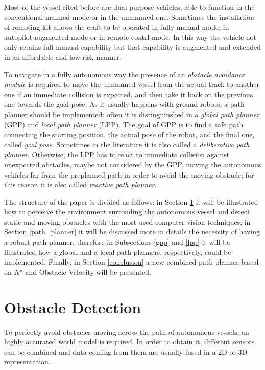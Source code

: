 \documentclass[12pt]{article}
\begin{document}
      \indent Most of the vessel cited before are dual-purpose vehicles, able to function in the conventional manned mode or in the unmanned one. Sometimes the installation of remoting kit allows the craft to be operated in fully manual mode, in autopilot-augmented mode or in remote-contrl mode. In this way the vehicle not only retains full manual capability but that capability is augmented and extended in an affordable and low-risk manner.

      \indent To navigate in a fully autonomous way the presence of an \textit{obstacle avoidance module} is required to move the unmanned vessel from the actual track to another one if an immediate collision is expected, and then take it back on the previous one towards the goal pose. As it usually happens with ground robots, a path planner should be implemented: often it is distinguinshed in a \textit{global path planner} (GPP) and \textit{local path planner} (LPP). The goal of GPP is to find a safe path connecting the starting position, the actual pose of the robot, and the final one, called \textit{goal pose}. Sometimes in the literature it is also called a \textit{deliberative path planner}. Otherwise, the LPP has to react to immediate collision against unexpected obstacles, maybe not considered by the GPP, moving the autonomous vehicles far from the preplanned path in order to avoid the moving obstacle; for this reason it is also called \textit{reactive path planner}.

      \indent The structure of the paper is divided as follows: in Section \ref{obs_det} it will be illustrated how to perceive the environment surronding the autonomous vessel and detect static and moving obstacles with the most used computer vision techniques; in Section \ref{path_planner} it will be discussed more in details the necessity of having a robust path planner, therefore in Subsections \ref{gpp} and \ref{lpp} it will be illustrated how a global and a local path planners, respectively, could be implemented. Finally, in Section \ref{conclusion} a new combined path planner based on A* and Obstacle Velocity will be presented.


\section{Obstacle Detection} \label{obs_det}

      \indent To perfectly avoid obstacles moving across the path of autonomous vessels, an highly accurated world model is required. In order to obtain it, different sensors can be combined and data coming from them are usually fused in a 2D or 3D representation.
\end{document}
